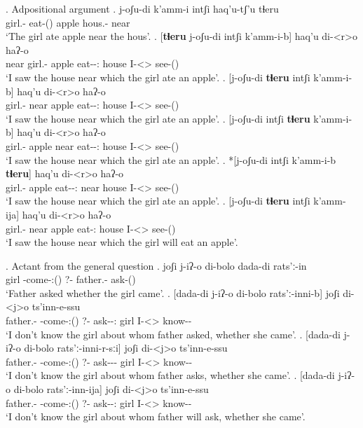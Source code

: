 \ex. Adpositional argument
	\ag. j-oʃu-di k'amm-i intʃi haq'u-tʃ'u tɬeru\\
			{girl.\Obl-\Erg} {eat-\Pst(\Aor)} apple {hous.\Obl-\Ads} near\\
			\glt `The girl ate apple near the hous'.
	\bg. 	[\textbf{tɬeru} j-oʃu-di  intʃi k'amm-i-b] haq'u di-<r>o haʔ-o\\
			near {girl.\Obl-\Erg} apple {eat-\Pst-\Ptcp:\Pst} house  {I-<\Nans>\Aff} {see-\Pst(\Aor)} \label{adposition-1}\\
			\glt `I saw the house near which the girl ate an apple'.
	\bg. 	[j-oʃu-di \textbf{tɬeru} intʃi k'amm-i-b] haq'u di-<r>o haʔ-o\\
			{girl.\Obl-\Erg} near apple {eat-\Pst-\Ptcp:\Pst} house  {I-<\Nans>\Aff} {see-\Pst(\Aor)} \label{adposition-first}\\
			\glt `I saw the house near which the girl ate an apple'.
	\bg. 	[j-oʃu-di intʃi \textbf{tɬeru} k'amm-i-b] haq'u di-<r>o haʔ-o\\
			{girl.\Obl-\Erg} apple near  {eat-\Pst-\Ptcp:\Pst} house  {I-<\Nans>\Aff} {see-\Pst(\Aor)} \\
			\glt `I saw the house near which the girl ate an apple'.
	\bg. 	*[j-oʃu-di intʃi k'amm-i-b \textbf{tɬeru}] haq'u di-<r>o haʔ-o\\
			{girl.\Obl-\Erg} apple {eat-\Pst-\Ptcp:\Pst} near house  {I-<\Nans>\Aff} {see-\Pst(\Aor)} \\
			\glt `I saw the house near which the girl ate an apple'. \label{adposition-2}
	\bg. 	[j-oʃu-di \textbf{tɬeru} intʃi k'amm-ija] haq'u di-<r>o haʔ-o\\
			{girl.\Obl-\Erg} near apple {eat-\Ptcp:\Fut} house  {I-<\Nans>\Aff} {see-\Pst(\Aor)} \\
			\glt `I saw the house near which the girl will eat an apple'.

\ex. Actant from the general question
	\ag. joʃi j-iʔ-o di-bolo dada-di rats'ː-in\\
			{girl} {\F-come-\Pst:(\Aor)} {?-\Indef} {father.\Obl-\Erg} {ask-\Pst(\Aor)}\\
			\glt `Father asked whether the girl came'.
	\bg. [dada-di  j-iʔ-o di-bolo rats'ː-inni-b] joʃi di-<j>o ts'inn-e-ssu\\
			{father.\Obl-\Erg} {\F-come-\Pst:(\Aor)} {?-\Indef} {ask-\Pst-\Ptcp:\Pst} {girl}  {I-<\F>\Aff} {know-\Hab-\Neg}\\
			\glt `I don't know the girl about whom father asked, whether she came'.
	\bg. [dada-di  j-iʔ-o di-bolo rats'ː-inni-r-sːi] joʃi di-<j>o ts'inn-e-ssu\\
			{father.\Obl-\Erg} {\F-come-\Pst:(\Aor)} {?-\Indef} {ask-\Pst-\Prog-\Attr} {girl}  {I-<\F>\Aff} {know-\Hab-\Neg}\\
			\glt `I don't know the girl about whom father asks, whether she came'.			
	\bg. [dada-di  j-iʔ-o di-bolo rats'ː-inn-ija] joʃi di-<j>o ts'inn-e-ssu\\
			{father.\Obl-\Erg} {\F-come-\Pst:(\Aor)} {?-\Indef} {ask-\Npst-\Ptcp:\Fut} {girl}  {I-<\F>\Aff} {know-\Hab-\Neg}\\
			\glt `I don't know the girl about whom father will ask, whether she came'.

